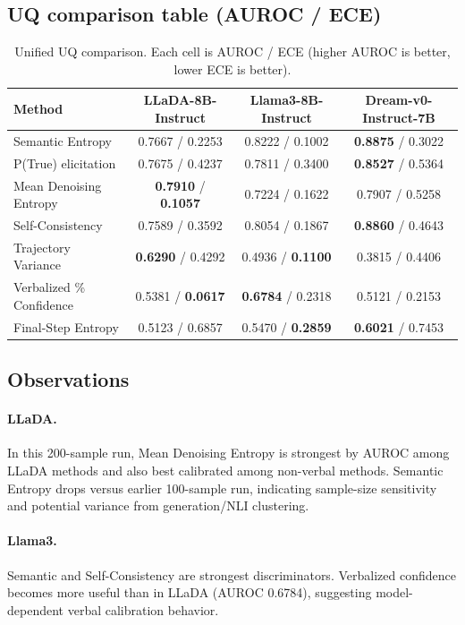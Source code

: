 \documentclass{article}
\begin{document}
\subsection{UQ comparison table (AUROC / ECE)}
\begin{table}[t]
\centering
\caption{Unified UQ comparison. Each cell is AUROC / ECE (higher AUROC is better, lower ECE is better).}
\label{tab:main}
\begin{tabular}{lccc}
\toprule
Method & LLaDA-8B-Instruct & Llama3-8B-Instruct & Dream-v0-Instruct-7B \\
\midrule
Semantic Entropy & 0.7667 / 0.2253 & 0.8222 / 0.1002 & \textbf{0.8875} / 0.3022 \\
P(True) elicitation & 0.7675 / 0.4237 & 0.7811 / 0.3400 & \textbf{0.8527} / 0.5364 \\
Mean Denoising Entropy & \textbf{0.7910} / \textbf{0.1057} & 0.7224 / 0.1622 & 0.7907 / 0.5258 \\
Self-Consistency & 0.7589 / 0.3592 & 0.8054 / 0.1867 & \textbf{0.8860} / 0.4643 \\
Trajectory Variance & \textbf{0.6290} / 0.4292 & 0.4936 / \textbf{0.1100} & 0.3815 / 0.4406 \\
Verbalized \% Confidence & 0.5381 / \textbf{0.0617} & \textbf{0.6784} / 0.2318 & 0.5121 / 0.2153 \\
Final-Step Entropy & 0.5123 / 0.6857 & 0.5470 / \textbf{0.2859} & \textbf{0.6021} / 0.7453 \\
\bottomrule
\end{tabular}
\end{table}

\subsection{Observations}
\paragraph{LLaDA.}
In this 200-sample run, Mean Denoising Entropy is strongest by AUROC among LLaDA methods and also best calibrated among non-verbal methods. Semantic Entropy drops versus earlier 100-sample run, indicating sample-size sensitivity and potential variance from generation/NLI clustering.

\paragraph{Llama3.}
Semantic and Self-Consistency are strongest discriminators. Verbalized confidence becomes more useful than in LLaDA (AUROC 0.6784), suggesting model-dependent verbal calibration behavior.
\end{document}
